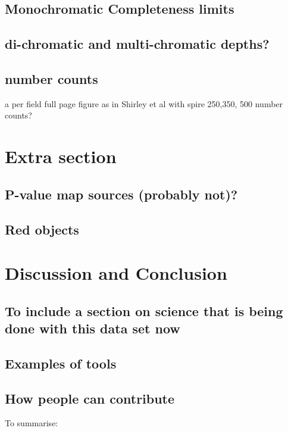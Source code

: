\documentclass[usenatbib]{mnras}
\begin{document}
\subsection{Monochromatic Completeness limits }

\subsection{di-chromatic and multi-chromatic depths?}

\subsection{number counts}
{\color{red} a per field full page figure as in Shirley et al with spire 250,350, 500 number counts?}


\section{Extra section}

\subsection{P-value map sources (probably not)?}
\subsection{Red objects}

\section{Discussion and Conclusion}

\subsection{To include a section on science that is being done with this data set now}


\subsection{Examples of tools}

\subsection{How people can contribute}


To summarise: 
\end{document}
